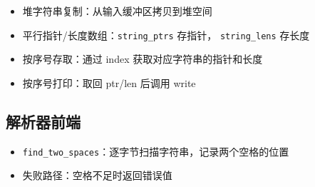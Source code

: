 \begin{itemize}
    \item 堆字符串复制：从输入缓冲区拷贝到堆空间
    \item 平行指针/长度数组：\texttt{string\_ptrs} 存指针，
          \texttt{string\_lens} 存长度
    \item 按序号存取：通过 index 获取对应字符串的指针和长度
    \item 按序号打印：取回 ptr/len 后调用 write
\end{itemize}

\subsection{解析器前端}

\begin{itemize}
    \item \texttt{find\_two\_spaces}：逐字节扫描字符串，记录两个空格的位置
    \item 失败路径：空格不足时返回错误值
\end{itemize}
